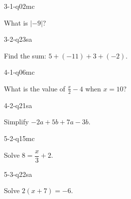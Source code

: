 \begin{practiceQuestion}{3-1-q02}{mc}
\begin{questionText}
What is $|-9|$?
\end{questionText}
\end{practiceQuestion}

\begin{practiceQuestion}{3-2-q23}{sa}
\begin{questionText}
Find the sum: $5 + (-11) + 3 + (-2)$.
\end{questionText}
\end{practiceQuestion}

\begin{practiceQuestion}{4-1-q06}{mc}
\begin{questionText}
What is the value of $\frac{x}{2} - 4$ when $x = 10$?
\end{questionText}
\end{practiceQuestion}

\begin{practiceQuestion}{4-2-q21}{sa}
\begin{questionText}
Simplify $-2a + 5b + 7a - 3b$.
\end{questionText}
\end{practiceQuestion}

\begin{practiceQuestion}{5-2-q15}{mc}
\begin{questionText}
Solve $8 = \dfrac{x}{3} + 2$.
\end{questionText}
\end{practiceQuestion}

\begin{practiceQuestion}{5-3-q22}{sa}
\begin{questionText}
Solve $2(x + 7) = -6$.
\end{questionText}
\end{practiceQuestion}

